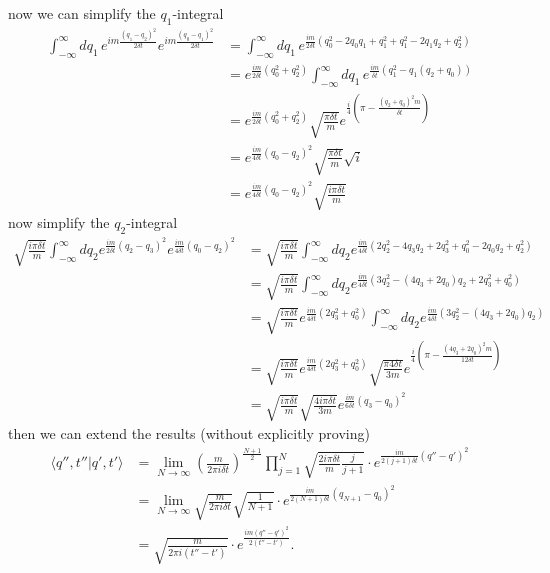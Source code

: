 \documentclass[10pt,a4paper]{article}
\theoremstyle{definition}
\begin{document}
now we can simplify the $q_1$-integral
\begin{align}
\int_{-\infty}^{\infty}dq_1\,e^{im\frac{(q_1-q_2)^2}{2\delta t}}e^{im\frac{(q_0-q_1)^2}{2\delta t}}
&=\int_{-\infty}^{\infty}dq_1\,e^{\frac{im}{2\delta t}(q_0^2-2q_0q_1+q_1^2+q_1^2-2q_1q_2+q_2^2)}\\
&=e^{\frac{im}{2\delta t}(q_0^2+q_2^2)}\int_{-\infty}^{\infty}dq_1\,e^{\frac{im}{\delta t}(q^2_1-q_1(q_2+q_0))}\\
&=e^{\frac{im}{2\delta t}(q_0^2+q_2^2)}\sqrt{\frac{\pi\delta t}{m}}e^{\frac{i}{4}\left(\pi-\frac{(q_2+q_0)^2m}{\delta t}\right)}\\
&=e^{\frac{im}{4\delta t}(q_0-q_2)^2}\sqrt{\frac{\pi\delta t}{m}}\sqrt{i}\\
&=e^{\frac{im}{4\delta t}(q_0-q_2)^2}\sqrt{\frac{i\pi\delta t}{m}}
\end{align}
now simplify the $q_2$-integral
\begin{align}
\sqrt{\frac{i\pi\delta t}{m}}\int_{-\infty}^\infty dq_2e^{\frac{im}{2\delta t}(q_2-q_3)^2}e^{\frac{im}{4\delta t}(q_0-q_2)^2}
&=\sqrt{\frac{i\pi\delta t}{m}}\int_{-\infty}^\infty dq_2e^{\frac{im}{4\delta t}(2q_2^2-4q_3q_2+2q_3^2+q_0^2-2q_0q_2+q_2^2)}\\
&=\sqrt{\frac{i\pi\delta t}{m}}\int_{-\infty}^\infty dq_2e^{\frac{im}{4\delta t}(3q_2^2-(4q_3+2q_0)q_2+2q_3^2+q_0^2)}\\
&=\sqrt{\frac{i\pi\delta t}{m}}e^{\frac{im}{4\delta t}(2q_3^2+q_0^2)}\int_{-\infty}^\infty dq_2e^{\frac{im}{4\delta t}(3q_2^2-(4q_3+2q_0)q_2)}\\
&=\sqrt{\frac{i\pi\delta t}{m}}e^{\frac{im}{4\delta t}(2q_3^2+q_0^2)}\sqrt{\frac{\pi4\delta t}{3m}}e^{\frac{i}{4}\left(\pi-\frac{(4q_3+2q_0)^2m}{12\delta t}\right)}\\
&=\sqrt{\frac{i\pi\delta t}{m}}\sqrt{\frac{4i\pi\delta t}{3m}}e^{\frac{im}{6\delta t}(q_3-q_0)^2}
\end{align}
then we can extend the results (without explicitly proving)
\begin{align}
\langle q'',t''|q',t'\rangle
&=\lim_{N\rightarrow\infty}\left(\frac{m}{2\pi i\delta t}\right)^\frac{N+1}{2}\prod_{j=1}^N\sqrt{\frac{2i\pi\delta t}{m}\frac{j}{j+1}}\cdot e^{\frac{im}{2(j+1)\delta t}(q''-q')^2}\\
&=\lim_{N\rightarrow\infty}\sqrt{\frac{m}{2\pi i\delta t}}\sqrt{\frac{1}{N+1}}\cdot e^{\frac{im}{2(N+1)\delta t}(q_{N+1}-q_0)^2}\\
&=\sqrt{\frac{m}{2\pi i(t''-t')}}\cdot e^{\frac{im(q''-q')^2}{2(t''-t')}}.
\end{align}
\end{document}
